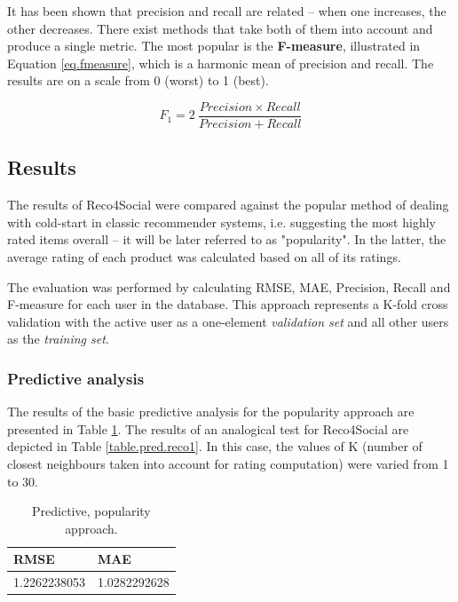 \documentclass[12pt]{report}
\begin{document}
It has been shown that precision and recall are related -- when one increases, the other decreases. There exist methods that take both of them into account and produce a single metric. The most popular is the {\bf F-measure}, illustrated in Equation \ref{eq.fmeasure}, which is a harmonic mean of precision and recall. The results are on a scale from 0 (worst) to 1 (best).

\begin{equation}
F_1 = 2\:\frac{Precision \times Recall}{Precision + Recall}
\label{eq.fmeasure}
\end{equation}
\hbox{}

\subsection{Results}

The results of Reco4Social were compared against the popular method of dealing with cold-start in classic recommender systems, i.e. suggesting the most highly rated items overall -- it will be later referred to as "popularity". In the latter, the average rating of each product was calculated based on all of its ratings.

The evaluation was performed by calculating RMSE, MAE, Precision, Recall and F-measure for each user in the database. This approach represents a K-fold cross validation with the active user as a one-element \textit{validation set} and all other users as the \textit{training set}.

\subsubsection{Predictive analysis}

The results of the basic predictive analysis for the popularity approach are presented in Table \ref{table.pred.popularity1}. The results of an analogical test for Reco4Social are depicted in Table \ref{table.pred.reco1}. In this case, the values of K (number of closest neighbours taken into account for rating computation) were varied from 1 to 30.

\begin{table}[htpb]
\centering
\caption{Predictive, popularity approach.}
\label{table.pred.popularity1}
\vspace{3mm}
\begin{tabular}{|l|l|}
\hline
{\bf RMSE}   & {\bf MAE}    \\ \hline
1.2262238053 & 1.0282292628 \\ \hline
\end{tabular}
\end{table}
\end{document}
